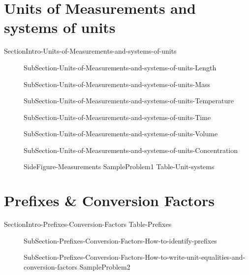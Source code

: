 \documentclass[main.tex]{subfiles}
\begin{document}
\section{Units of Measurements and systems of units}
{SectionIntro-Units-of-Measurements-and-systems-of-units}
\sloppy\begin{description}
\item[]{SubSection-Units-of-Measurements-and-systems-of-units-Length}
\item[]{SubSection-Units-of-Measurements-and-systems-of-units-Mass}
\item[]{SubSection-Units-of-Measurements-and-systems-of-units-Temperature}
\item[]{SubSection-Units-of-Measurements-and-systems-of-units-Time}
\item[]{SubSection-Units-of-Measurements-and-systems-of-units-Volume}
\item[]{SubSection-Units-of-Measurements-and-systems-of-units-Concentration}

{SideFigure-Measurements}
{SampleProblem1}
{Table-Unit-systems}
\end{description}


\section{Prefixes \& Conversion Factors}
{SectionIntro-Prefixes-Conversion-Factors}
{Table-Prefixes}
\sloppy\begin{description}
\item[]{SubSection-Prefixes-Conversion-Factors-How-to-identify-prefixes}
\item[]{SubSection-Prefixes-Conversion-Factors-How-to-write-unit-equalities-and-conversion-factors}
{SampleProblem2}
\end{description}
\end{document}
